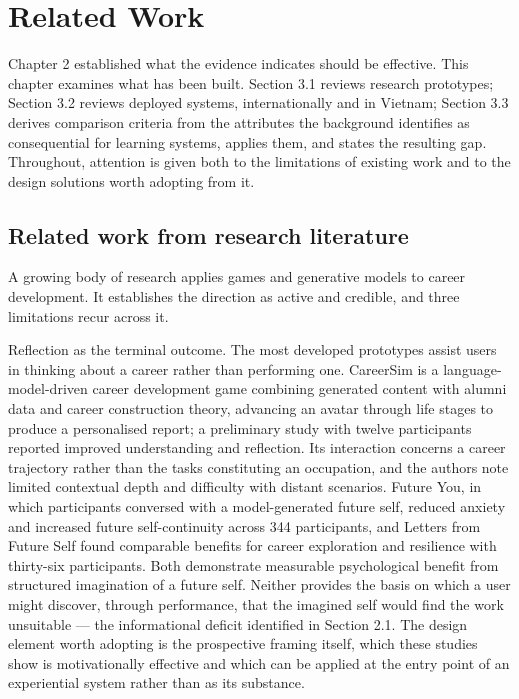 \newpage
\section{Related Work}

Chapter 2 established what the evidence indicates should be effective. This chapter examines what has been built. Section 3.1 reviews research prototypes; Section 3.2 reviews deployed systems, internationally and in Vietnam; Section 3.3 derives comparison criteria from the attributes the background identifies as consequential for learning systems, applies them, and states the resulting gap. Throughout, attention is given both to the limitations of existing work and to the design solutions worth adopting from it.

\subsection{Related work from research literature}

A growing body of research applies games and generative models to career development. It establishes the direction as active and credible, and three limitations recur across it.

Reflection as the terminal outcome. The most developed prototypes assist users in thinking about a career rather than performing one. CareerSim\cite{r76} is a language-\allowbreak{}model-\allowbreak{}driven career development game combining generated content with alumni data and career construction theory, advancing an avatar through life stages to produce a personalised report; a preliminary study with twelve participants reported improved understanding and reflection. Its interaction concerns a career trajectory rather than the tasks constituting an occupation, and the authors note limited contextual depth and difficulty with distant scenarios. Future You\cite{r77}, in which participants conversed with a model-\allowbreak{}generated future self, reduced anxiety and increased future self-\allowbreak{}continuity across 344 participants, and Letters from Future Self\cite{r78} found comparable benefits for career exploration and resilience with thirty-six participants. Both demonstrate measurable psychological benefit from structured imagination of a future self. Neither provides the basis on which a user might discover, through performance, that the imagined self would find the work unsuitable --- the informational deficit identified in Section 2.1. The design element worth adopting is the prospective framing itself, which these studies show is motivationally effective and which can be applied at the entry point of an experiential system rather than as its substance.

